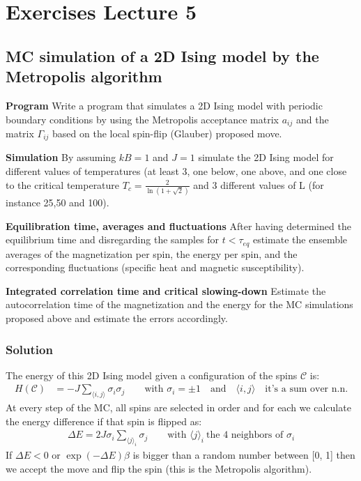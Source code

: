 \documentclass[../main.tex]{subfiles}
\begin{document}
\chapter{Exercises Lecture 5}

\section{MC simulation of a 2D Ising model by the Metropolis algorithm}

\noindent\textbf{Program} Write a program that simulates a 2D Ising model with periodic boundary conditions by using the Metropolis acceptance matrix $a_{ij}$ and the matrix $\Gamma_{ij}$ based on the local spin-flip (Glauber) proposed move.

\noindent\textbf{Simulation} By assuming $kB = 1$ and $J = 1$ simulate the 2D Ising model for different values of temperatures (at least 3, one below, one above, and one close to the critical temperature $T_c = \frac{2}{\ln(1+\sqrt{2})}$ and 3 different
values of L (for instance 25,50 and 100).

\noindent\textbf{Equilibration time, averages and fluctuations} After having determined the equilibrium time and disregarding the samples for $t < \tau_{eq}$ estimate the ensemble averages of the magnetization per spin, the energy per spin, and the corresponding fluctuations (specific heat and magnetic susceptibility). 

\noindent \textbf{Integrated correlation time and critical slowing-down} Estimate the autocorrelation time of the magnetization and the energy for the MC simulations proposed above and estimate the errors accordingly.

\subsection{Solution}

The energy of this 2D Ising model given a configuration of the spins $\mathcal{C}$ is:
\begin{align}
H(\mathcal{C}) &= -J \sum_{\langle i, j \rangle} \sigma_i \sigma_j \quad\quad\text{with } \sigma_i=\pm 1\quad \text{and}\quad \langle i, j \rangle\quad\text{it's a sum over n.n.}
\end{align} At every step of the MC, all spins are selected in order and for each we calculate the energy difference if that spin is flipped as:
\begin{align}
\Delta E = 2J\sigma_i \sum_{{\langle j \rangle}_i}\sigma_j  \quad\quad\text{with } {\langle j \rangle}_i\ \text{the 4 neighbors of }\sigma_i
\end{align} If $\Delta E < 0$ or $\exp{(-\Delta E)\beta}$ is bigger than a random number between [0, 1] then we accept the move and flip the spin (this is the Metropolis algorithm).
\end{document}

